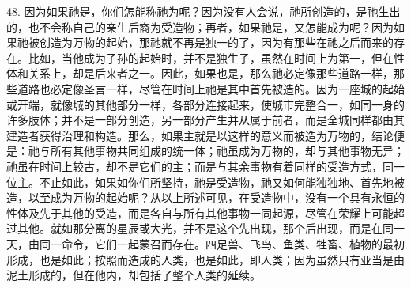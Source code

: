48. 因为如果祂是，你们怎能称祂为呢？因为没有人会说，祂所创造的，是祂生出的，也不会称自己的亲生后裔为受造物；再者，如果祂是，又怎能成为呢？因为如果祂被创造为万物的起始，那祂就不再是独一的了，因为有那些在祂之后而来的存在。比如，当他成为子孙的起始时，并不是独生子，虽然在时间上为第一，但在性体和关系上，却是后来者之一。因此，如果也是，那么祂必定像那些道路一样，那些道路也必定像圣言一样，尽管在时间上祂是其中首先被造的。因为一座城的起始或开端，就像城的其他部分一样，各部分连接起来，使城市完整合一，如同一身的许多肢体；并不是一部分创造，另一部分产生并从属于前者，而是全城同样都由其建造者获得治理和构造。那么，如果主就是以这样的意义而被造为万物的，结论便是：祂与所有其他事物共同组成的统一体；祂虽成为万物的，却与其他事物无异；祂虽在时间上较古，却不是它们的主；而是与其余事物有着同样的受造方式，同一位主。不止如此，如果如你们所坚持，祂是受造物，祂又如何能独独地、首先地被造，以至成为万物的起始呢？从以上所述可见，在受造物中，没有一个具有永恒的性体及先于其他的受造，而是各自与所有其他事物一同起源，尽管在荣耀上可能超过其他。就如那分离的星辰或大光，并不是这个先出现，那个后出现，而是在同一天，由同一命令，它们一起蒙召而存在。四足兽、飞鸟、鱼类、牲畜、植物的最初形成，也是如此；按照而造成的人类，也是如此，即人类；因为虽然只有亚当是由泥土形成的，但在他内，却包括了整个人类的延续。\par

